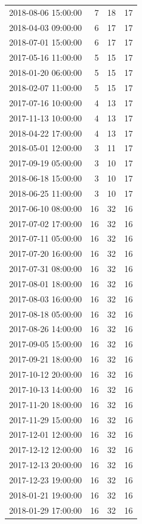 \begin{tabular}{lrrr}
2018-08-06 15:00:00 & 7 & 18 & 17 \\
2018-04-03 09:00:00 & 6 & 17 & 17 \\
2018-07-01 15:00:00 & 6 & 17 & 17 \\
2017-05-16 11:00:00 & 5 & 15 & 17 \\
2018-01-20 06:00:00 & 5 & 15 & 17 \\
2018-02-07 11:00:00 & 5 & 15 & 17 \\
2017-07-16 10:00:00 & 4 & 13 & 17 \\
2017-11-13 10:00:00 & 4 & 13 & 17 \\
2018-04-22 17:00:00 & 4 & 13 & 17 \\
2018-05-01 12:00:00 & 3 & 11 & 17 \\
2017-09-19 05:00:00 & 3 & 10 & 17 \\
2018-06-18 15:00:00 & 3 & 10 & 17 \\
2018-06-25 11:00:00 & 3 & 10 & 17 \\
2017-06-10 08:00:00 & 16 & 32 & 16 \\
2017-07-02 17:00:00 & 16 & 32 & 16 \\
2017-07-11 05:00:00 & 16 & 32 & 16 \\
2017-07-20 16:00:00 & 16 & 32 & 16 \\
2017-07-31 08:00:00 & 16 & 32 & 16 \\
2017-08-01 18:00:00 & 16 & 32 & 16 \\
2017-08-03 16:00:00 & 16 & 32 & 16 \\
2017-08-18 05:00:00 & 16 & 32 & 16 \\
2017-08-26 14:00:00 & 16 & 32 & 16 \\
2017-09-05 15:00:00 & 16 & 32 & 16 \\
2017-09-21 18:00:00 & 16 & 32 & 16 \\
2017-10-12 20:00:00 & 16 & 32 & 16 \\
2017-10-13 14:00:00 & 16 & 32 & 16 \\
2017-11-20 18:00:00 & 16 & 32 & 16 \\
2017-11-29 15:00:00 & 16 & 32 & 16 \\
2017-12-01 12:00:00 & 16 & 32 & 16 \\
2017-12-12 12:00:00 & 16 & 32 & 16 \\
2017-12-13 20:00:00 & 16 & 32 & 16 \\
2017-12-23 19:00:00 & 16 & 32 & 16 \\
2018-01-21 19:00:00 & 16 & 32 & 16 \\
2018-01-29 17:00:00 & 16 & 32 & 16 \\

\end{tabular}
